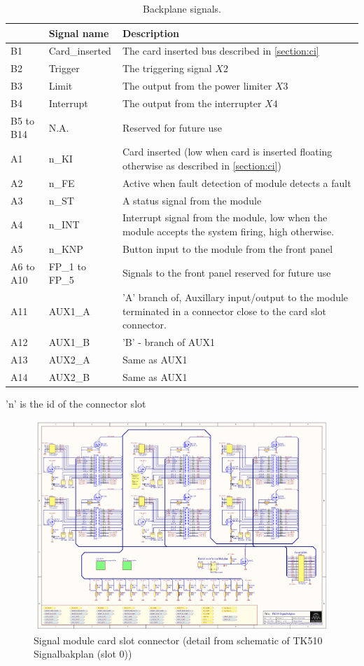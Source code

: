 \begin{table}[h!]
    \centering
    \begin{tabular}{|p{}|p{}|p{}|}
        \hline
        & Signal name & Description \\ \hline
        B1 & Card\_inserted & The card inserted bus described in \cref{section:ci} \\ \hline
        B2 & Trigger & The triggering signal $X2$ \\ \hline
        B3 & Limit & The output from the power limiter $X3$ \\ \hline
        B4 & Interrupt & The output from the interrupter $X4$ \\ \hline
        B5 to B14 & N.A. & Reserved for future use \\ \hline
        A1 & n\_KI & Card inserted (low when card is inserted floating otherwise as described in \cref{section:ci}) \\ \hline
        A2 & n\_FE & Active when fault detection of module detects a fault \\ \hline
        A3 & n\_ST & A status signal from the module \\ \hline
        A4 & n\_INT & Interrupt signal from the module, low when the module accepts the system firing, high otherwise. \\ \hline
        A5 & n\_KNP & Button input to the module from the front panel\\ \hline
        A6 to A10 & FP\_1 to FP\_5 & Signals to the front panel reserved for future use\\ \hline
        A11 & AUX1\_A & 'A' branch of, Auxillary input/output to the module terminated in a connector close to the card slot connector.\\ \hline
        A12 & AUX1\_B & 'B' - branch of AUX1\\ \hline
        A13 & AUX2\_A & Same as AUX1\\ \hline
        A14 & AUX2\_B & Same as AUX1 \\ \hline
    \end{tabular}
    \caption{Backplane signals.}
    'n' is the id of the connector slot
    \label{tab:bus}
\end{table}

\begin{figure}[h]
    \centering
    \includegraphics[trim={4.1cm 14.3cm 21.2cm 3.3cm},clip,width=\textwidth]{img/TK510_Signalbakplan.pdf}
    \caption{Signal module card slot connector (detail from schematic of TK510 Signalbakplan (slot 0))}
    \label{fig:signalmodulslotimg}
\end{figure}
